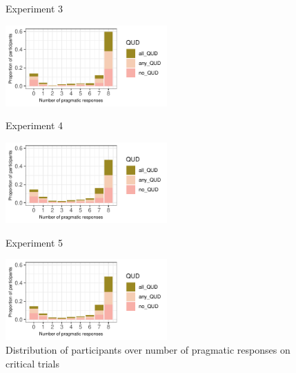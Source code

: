 \documentclass[12pt]{article}
\begin{document}
\begin{figure}[!ht] 
    \begin{minipage}{.32\textwidth}
    \caption*{Experiment 3}
    \includegraphics[height=3.1cm]{img/exp3_count_pragmatic.pdf}
    \end{minipage}%
    \begin{minipage}{.32\textwidth}
    \caption*{Experiment 4}
    \includegraphics[height=3.1cm]{img/exp4_count_pragmatic.pdf}
    \end{minipage}%
    \begin{minipage}{.32\textwidth}
    \caption*{Experiment 5}
    \includegraphics[height=3.1cm]{img/exp4_count_pragmatic.pdf}
    \end{minipage}%
    \caption{Distribution of participants over number of pragmatic responses on critical trials}
\end{figure}

\end{document}
